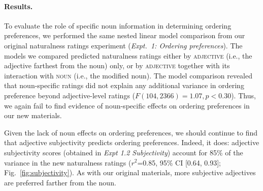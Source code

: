 \documentclass[12pt]{article}
\begin{document}
\paragraph{Results.}

To evaluate the role of specific noun information in determining ordering preferences, we performed the same nested linear model comparison from our original naturalness ratings experiment (\emph{Expt.~1: Ordering preferences}). The models we compared predicted naturalness ratings either by \textsc{adjective} (i.e., the adjective farthest from the noun) only, or by \textsc{adjective} together with its interaction with \textsc{noun} (i.e., the modified noun).
The model comparison revealed that noun-specific ratings did not explain any additional variance in ordering preference beyond adjective-level ratings ($F(104,2366) = 1.07, p < 0.30$).  Thus, we again fail to find evidence of noun-specific effects on ordering preferences in our new materials. 


%
%
%
%
%


Given the lack of noun effects on ordering preferences, we should continue to find that adjective subjectivity predicts ordering preferences. Indeed, it does: adjective subjectivity scores (obtained in \emph{Expt 1.2 Subjectivity}) account for  85\% of the variance in the new naturalness ratings ($r^2${=}0.85, 95\% CI [0.64,  0.93]; Fig.~\ref{fig:subjectivity}). 
As with our original materials, more subjective adjectives are preferred farther from the noun.
\end{document}
